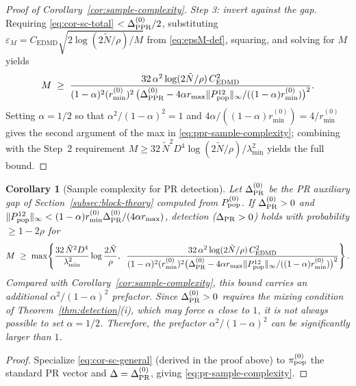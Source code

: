 \documentclass{article}
\theoremstyle{plain}
\newtheorem{corollary}{Corollary}[theorem]
\theoremstyle{definition}
\begin{document}
\begin{proof}[Proof of Corollary~\ref{cor:sample-complexity}]
	\emph{Step 3: invert against the gap.} Requiring \eqref{eq:cor-sc-total} $< \Delta_{\textnormal{PPR}}^{(0)}/2$, substituting $\varepsilon_M = C_{\text{EDMD}}\sqrt{2\log(2\tilde N/\rho)/M}$ from \eqref{eq:epsM-def}, squaring, and solving for $M$ yields
	\begin{equation}\label{eq:cor-sc-general}
		M \;\geq\; \frac{32\,\alpha^2\log(2\tilde N/\rho)\,C_{\text{EDMD}}^2}{(1-\alpha)^2 (r^{(0)}_{\min})^2\,\bigl(\Delta_{\textnormal{PPR}}^{(0)} - 4\alpha r_{\max}\|P^{12}_{\mathrm{pop}}\|_\infty/((1-\alpha)r^{(0)}_{\min})\bigr)^2}.
	\end{equation}
	Setting $\alpha = 1/2$ so that $\alpha^2/(1-\alpha)^2 = 1$ and $4\alpha/((1-\alpha)r^{(0)}_{\min}) = 4/r^{(0)}_{\min}$ gives the second argument of the max in \eqref{eq:ppr-sample-complexity}; combining with the Step~2 requirement $M \geq 32\,\tilde{N}^2 D^4 \log(2\tilde{N}/\rho)/\lambda_{\min}^2$ yields the full bound.
\end{proof}


\begin{corollary}[Sample complexity for PR detection]\label{cor:pr-sample-complexity}
	Let $\Delta^{(0)}_{\textnormal{PR}}$ be the PR auxiliary gap of Section~\ref{subsec:block-theory} computed from $P^{(0)}_{\textnormal{pop}}$.
		If $\Delta^{(0)}_{\textnormal{PR}} > 0$ and $\|P^{12}_{\mathrm{pop}}\|_\infty < (1-\alpha)r^{(0)}_{\min}\Delta^{(0)}_{\textnormal{PR}}/(4\alpha r_{\max})$, detection ($\Delta_{\textnormal{PR}} > 0$) holds with probability $\geq 1-2\rho$ for
		\begin{equation}\label{eq:pr-sample-complexity}
			M \;\geq\; \max\!\left\{\frac{32\,\tilde{N}^2 D^4}{\lambda_{\min}^2}\log\frac{2\tilde{N}}{\rho},\;\; \frac{32\,\alpha^2\log(2\tilde{N}/\rho)\, C_{\text{EDMD}}^2}{(1-\alpha)^2 (r^{(0)}_{\min})^2\bigl(\Delta^{(0)}_{\textnormal{PR}} - 4\alpha r_{\max}\|P^{12}_{\mathrm{pop}}\|_\infty/((1-\alpha)r^{(0)}_{\min})\bigr)^2}\right\}.
		\end{equation}
		Compared with Corollary~\ref{cor:sample-complexity}, this bound carries an additional $\alpha^2/(1-\alpha)^2$ prefactor. Since $\Delta^{(0)}_{\textnormal{PR}} > 0$ requires the mixing condition of Theorem~\ref{thm:detection}(i), 
		which may force $\alpha$ close to $1$, it is not always possible to set $\alpha = 1/2$. Therefore, the prefactor $\alpha^2/(1-\alpha)^2$ can be significantly larger than $1$. 
\end{corollary}

\begin{proof}%
	Specialize \eqref{eq:cor-sc-general} (derived in the proof above) to $\pi_{\textnormal{pop}}^{(0)}$ the standard PR vector and $\Delta = \Delta^{(0)}_{\textnormal{PR}}$, giving \eqref{eq:pr-sample-complexity}.
\end{proof}
\end{document}
